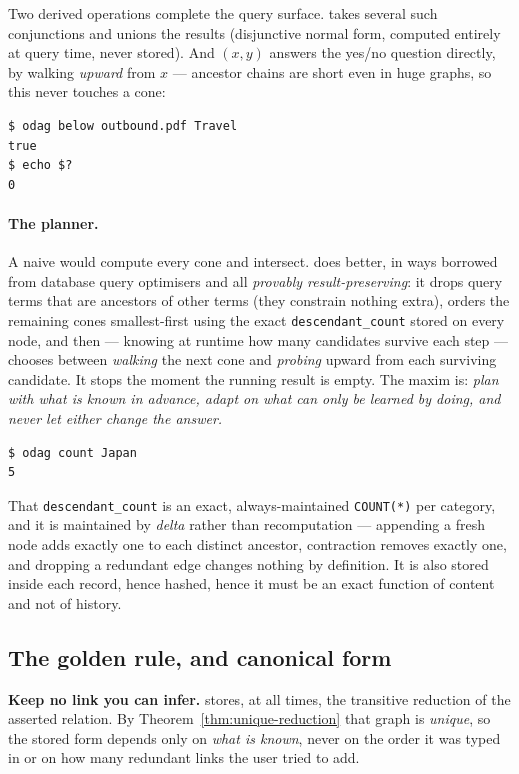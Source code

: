 Two derived operations complete the query surface.  takes
several such conjunctions and unions the results (disjunctive normal form,
computed entirely at query time, never stored). And $(x, y)$
answers the yes/no question directly, by walking \emph{upward} from $x$ ---
ancestor chains are short even in huge graphs, so this never touches a cone:

\begin{lstlisting}
$ odag below outbound.pdf Travel
true
$ echo $?
0
\end{lstlisting}

\paragraph{The planner.} A naive  would compute every cone and
intersect. \odag{} does better, in ways borrowed from database query
optimisers and all \emph{provably result-preserving}: it drops query terms
that are ancestors of other terms (they constrain nothing extra), orders the
remaining cones smallest-first using the exact \verb|descendant_count| stored
on every node, and then --- knowing at runtime how many candidates survive
each step --- chooses between \emph{walking} the next cone and \emph{probing}
upward from each surviving candidate. It stops the moment the running result
is empty. The maxim is: \emph{plan with what is known in advance, adapt on
what can only be learned by doing, and never let either change the answer.}

\begin{lstlisting}
$ odag count Japan
5
\end{lstlisting}

That \verb|descendant_count| is an exact, always-maintained
\verb|COUNT(*)| per category, and it is maintained by \emph{delta} rather than
recomputation --- appending a fresh node adds exactly one to each distinct
ancestor, contraction removes exactly one, and dropping a redundant edge
changes nothing by definition. It is also stored inside each record, hence
hashed, hence it must be an exact function of content and not of history.

\subsection{The golden rule, and canonical form}
\label{sec:canonical}

\begin{keyidea}
\textbf{Keep no link you can infer.} \odag{} stores, at all times, the
transitive reduction of the asserted relation. By
Theorem~\ref{thm:unique-reduction} that graph is \emph{unique}, so the stored
form depends only on \emph{what is known}, never on the order it was typed in
or on how many redundant links the user tried to add.
\end{keyidea}

